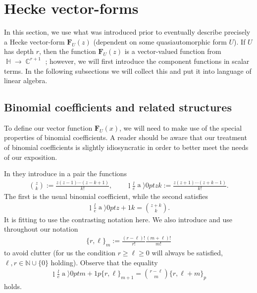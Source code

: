 \documentclass[11pt]{article}
\DeclareMathOperator{\CC}{\mathbb{C}}
\DeclareMathOperator{\HH}{\mathbb{H}}
\DeclareRobustCommand{\binomer}{\genfrac\langle\rangle{0pt}{}}
\begin{document}
\section{Hecke vector-forms}

In this section, we use what was introduced prior to eventually describe precisely a Hecke vector-form $\mathbf{F}_U(z) $ (dependent on some quasiautomorphic form $U$). If $U$ has depth $r$, then the function $ \mathbf{F}_U(z) $ is a vector-valued function from $\HH \rightarrow \CC^{r+1}$ ; however, we will first introduce the component functions in scalar terms. In the following subsections we will collect this and put it into language of linear algebra.


\subsection{Binomial coefficients and related structures}

To define our vector function $ \mathbf{F}_U(x) $, we will need to make use of the special properties of binomial coefficients. A reader should be aware that our treatment of binomial coefficients is slightly idiosyncratic in order to better meet the needs of our exposition. 

In \cite{comtet1974} they introduce in a pair the functions
    \begin{eqnarray*}
        \binom{z}{k} := \frac{z(z-1)\cdots(z-k+1)}{k!}, \qquad
        \binomer{z}{k} := \frac{z(z+1)\cdots(z+k-1)}{k!}.  
    \end{eqnarray*}
The first is the usual binomial coefficient, while the second satisfies
    \begin{eqnarray*}
        \binomer{z+1}{k} = \binom{z+k}{k}.
    \end{eqnarray*}
It is fitting to use the contrasting notation here. We also introduce and use throughout our notation
    \begin{eqnarray*}
        \{ r,\ell \}_m :=  \frac{(r-\ell)!}{r!} \frac{(m+\ell)!}{m!}  
    \end{eqnarray*}
to avoid clutter (for us the condition $ r \geq \ell \geq 0 $ will always be satisfied, $ \ell, r \in \mathbb{N}\cup\{0\} $ holding). Observe that the equality 
    \begin{eqnarray}\label{eq:coeffEquiv}
        \binomer{m+1}{p}\{r,\ell \}_{m+1} = \binom{r-\ell}{m}\{r,\ell + m\}_p
    \end{eqnarray}
holds. 
\end{document}
